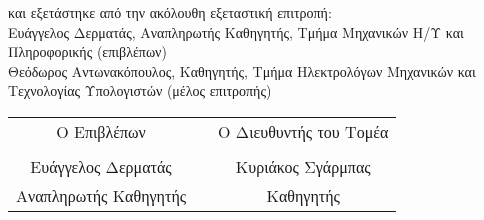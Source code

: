 \begin{titlepage}
\begin{center}
        και εξετάστηκε από την ακόλουθη εξεταστική επιτροπή:\\[8pt]
        
        Ευάγγελος Δερματάς, Αναπληρωτής Καθηγητής, Τμήμα Μηχανικών Η/Υ και Πληροφορικής (επιβλέπων)\\
        Θεόδωρος Αντωνακόπουλος, Καθηγητής, Τμήμα Ηλεκτρολόγων Μηχανικών και Τεχνολογίας Υπολογιστών (μέλος επιτροπής)\\

        \vfill
        \begin{center}
        \begin{tabular}{c c c}
          Ο Επιβλέπων &  & Ο Διευθυντής του Τομέα    \\
           &  &    \\[28pt]
          Ευάγγελος Δερματάς  &  & Κυριάκος Σγάρμπας   \\[8pt]
          Αναπληρωτής Καθηγητής &  & Καθηγητής 
        \end{tabular}
        \end{center}

    \end{center}

    
\end{titlepage}